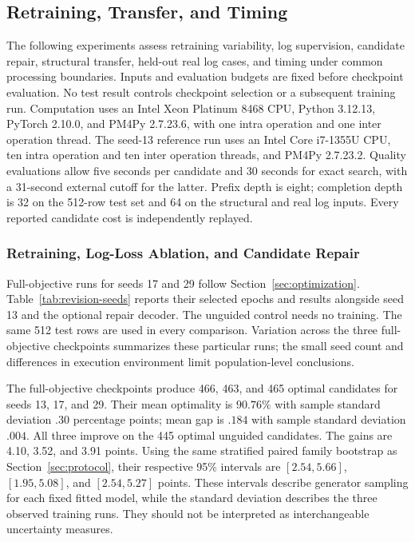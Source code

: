 \begin{revised}
\subsection{Retraining, Transfer, and Timing}
\label{sec:revision-experiments}

The following experiments assess retraining variability, log supervision, candidate repair, structural transfer, held-out real log cases, and timing under common processing boundaries. Inputs and evaluation budgets are fixed before checkpoint evaluation. No test result controls checkpoint selection or a subsequent training run. Computation uses an Intel Xeon Platinum 8468 CPU, Python 3.12.13, PyTorch 2.10.0, and PM4Py 2.7.23.6, with one intra operation and one inter operation thread. The seed-13 reference run uses an Intel Core i7-1355U CPU, ten intra operation and ten inter operation threads, and PM4Py 2.7.23.2. Quality evaluations allow five seconds per candidate and 30 seconds for exact search, with a 31-second external cutoff for the latter. Prefix depth is eight; completion depth is 32 on the 512-row test set and 64 on the structural and real log inputs. Every reported candidate cost is independently replayed.

\subsubsection{Retraining, Log-Loss Ablation, and Candidate Repair}

Full-objective runs for seeds 17 and 29 follow Section~\ref{sec:optimization}. Table~\ref{tab:revision-seeds} reports their selected epochs and results alongside seed 13 and the optional repair decoder. The unguided control needs no training. The same 512 test rows are used in every comparison. Variation across the three full-objective checkpoints summarizes these particular runs; the small seed count and differences in execution environment limit population-level conclusions.



The full-objective checkpoints produce 466, 463, and 465 optimal candidates for seeds 13, 17, and 29. Their mean optimality is $90.76\%$ with sample standard deviation $.30$ percentage points; mean gap is $.184$ with sample standard deviation $.004$. All three improve on the 445 optimal unguided candidates. The gains are 4.10, 3.52, and 3.91 points. Using the same stratified paired family bootstrap as Section~\ref{sec:protocol}, their respective 95\% intervals are $[2.54,5.66]$, $[1.95,5.08]$, and $[2.54,5.27]$ points. These intervals describe generator sampling for each fixed fitted model, while the standard deviation describes the three observed training runs. They should not be interpreted as interchangeable uncertainty measures.


\end{revised}
